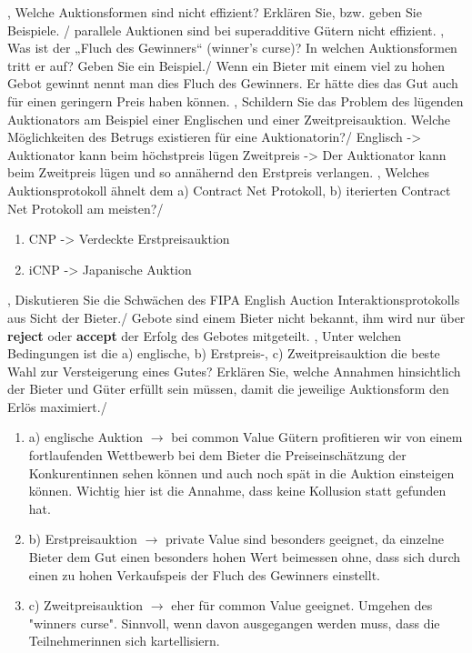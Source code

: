 \documentclass[11pt]{article}
\begin{document}
{{    },
    {Welche Auktionsformen sind nicht effizient? Erklären Sie, bzw. geben Sie Beispiele.}
    /
    {
        parallele Auktionen sind bei superadditive Gütern nicht effizient.
    },
    {Was ist der „Fluch des Gewinners“ (winner’s curse)? In welchen Auktionsformen tritt er auf? Geben Sie ein Beispiel.}/
    {
        Wenn ein Bieter mit einem viel zu hohen Gebot gewinnt nennt man dies Fluch des Gewinners. Er hätte dies das Gut auch für einen geringern Preis haben können.
    },
    {Schildern Sie das Problem des lügenden Auktionators am Beispiel einer Englischen und einer Zweitpreisauktion. Welche Möglichkeiten des Betrugs existieren für eine Auktionatorin?}/
    {
        Englisch -> Auktionator kann beim höchstpreis lügen
        Zweitpreis -> Der Auktionator kann beim Zweitpreis lügen und so annähernd den Erstpreis verlangen.
    },
    {Welches Auktionsprotokoll ähnelt dem a) Contract Net Protokoll, b) iterierten Contract Net Protokoll am meisten?}/
    {
        \begin{enumerate}
            \item CNP -> Verdeckte Erstpreisauktion
            \item iCNP -> Japanische Auktion
        \end{enumerate}
    },
    {Diskutieren Sie die Schwächen des FIPA English Auction Interaktionsprotokolls aus Sicht der Bieter.}/
    {
        Gebote sind einem Bieter nicht bekannt, ihm wird nur über \textbf{reject} oder \textbf{accept} der Erfolg des Gebotes mitgeteilt.
    },
    {Unter welchen Bedingungen ist die a) englische, b) Erstpreis-, c) Zweitpreisauktion die beste Wahl zur Versteigerung eines Gutes? Erklären Sie, welche Annahmen hinsichtlich der Bieter und Güter erfüllt sein müssen, damit die jeweilige Auktionsform den Erlös maximiert.}/
    {
        \begin{enumerate}
            \item a) englische Auktion $\to$ bei common Value Gütern profitieren wir von einem fortlaufenden Wettbewerb bei dem Bieter die Preiseinschätzung der Konkurentinnen sehen können und auch noch spät in die Auktion einsteigen können. Wichtig hier ist die Annahme, dass keine Kollusion statt gefunden hat.
            \item b) Erstpreisauktion $\to$ private Value sind besonders geeignet, da einzelne Bieter dem Gut einen besonders hohen Wert beimessen ohne, dass sich durch einen zu hohen Verkaufspeis der Fluch des Gewinners einstellt.
            \item c) Zweitpreisauktion $\to$ eher für common Value geeignet. Umgehen des "winners curse". Sinnvoll, wenn davon ausgegangen werden muss, dass die Teilnehmerinnen sich kartellisiern.

\end{enumerate}}}
\end{document}
